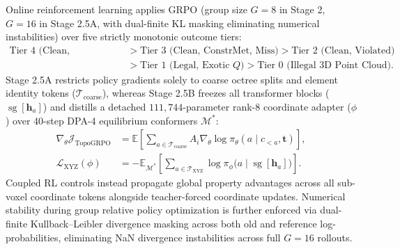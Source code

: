 \documentclass[11pt,a4paper]{article}
\begin{document}
Online reinforcement learning applies GRPO\cite{shao2024grpo} (group size $G=8$ in Stage 2, $G=16$ in Stage 2.5A, with dual-finite KL masking eliminating numerical instabilities) over five strictly monotonic outcome tiers:
\begin{equation}
\begin{aligned}
\text{Tier 4 (Clean, ConstrMet, Hit)} &> \text{Tier 3 (Clean, ConstrMet, Miss)} > \text{Tier 2 (Clean, Violated)} \\
&> \text{Tier 1 (Legal, Exotic } Q) > \text{Tier 0 (Illegal 3D Point Cloud)}.
\end{aligned}
\end{equation}
Stage 2.5A restricts policy gradients solely to coarse octree splits and element identity tokens ($\mathcal{T}_{\text{coarse}}$), whereas Stage 2.5B freezes all transformer blocks ($\operatorname{sg}[\mathbf{h}_a]$) and distills a detached $111{,}744$-parameter rank-8 coordinate adapter ($\phi$) over 40-step DPA-4 equilibrium conformers $\mathcal{M}^*$:
\begin{equation}
\begin{aligned}
\nabla_\theta \mathcal{J}_{\text{TopoGRPO}} &= \mathbb{E}\!\left[\sum_{a\in\mathcal{T}_{\text{coarse}}} A_i \nabla_\theta \log \pi_\theta(a\mid c_{<a},\mathbf{t})\right], \\
\mathcal{L}_{\text{XYZ}}(\phi) &= -\mathbb{E}_{\mathcal{M}^*}\!\left[\sum_{a\in\mathcal{T}_{\text{XYZ}}} \log \pi_\phi\!\big(a\mid\operatorname{sg}[\mathbf{h}_a]\big)\right].
\end{aligned}
\end{equation}
Coupled RL controls instead propagate global property advantages across all sub-voxel coordinate tokens alongside teacher-forced coordinate updates. Numerical stability during group relative policy optimization is further enforced via dual-finite Kullback--Leibler divergence masking across both old and reference log-probabilities, eliminating NaN divergence instabilities across full $G=16$ rollouts.
\end{document}
